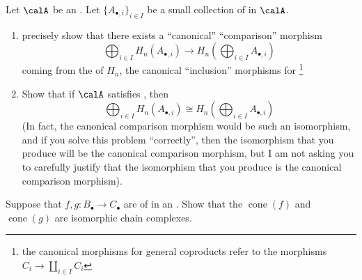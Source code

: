 \begin{problem}
    Let $\calA$ be an . Let $\{A_{\bullet, i}\}_{i \in I}$ be a small collection of  in $\calA$.
    \begin{enumerate}
        \item precisely show that there exists a ``canonical'' ``comparison'' morphism  
        $$\bigoplus_{i \in I} H_n(A_{\bullet, i}) \to H_n\left( \bigoplus_{i \in I} A_{\bullet, i} \right)$$
        coming from the  of $H_n$, the canonical ``inclusion'' morphisms for \footnote{the canonical morphisms for general coproducts refer to the morphisms $C_i \to \coprod_{i \in I} C_i$}

        \item Show that if $\calA$ satisfies , then 
        $$\bigoplus_{i \in I} H_n(A_{\bullet,i}) \cong H_n\left( \bigoplus_{i \in I} A_{\bullet,i} \right)$$
        (In fact, the canonical comparison morphism would be such an isomorphism, and if you solve this problem ``correctly'', then the isomorphism that you produce will be the canonical comparison morphism, but I am not asking you to carefully justify that the isomorphism that you produce is the canonical comparison morphism).
    \end{enumerate}
    
\end{problem}

\begin{problem}
    Suppose that $f,g: B_\bullet \to C_\bullet$ are   of  in an . 
    Show that the  $\operatorname{cone}(f)$ and $\operatorname{cone}(g)$ are isomorphic chain complexes.
\end{problem}


